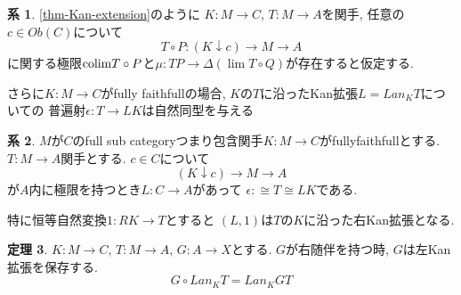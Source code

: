 \documentclass[dvipdfmx,a4paper,11pt]{report}
\newcommand{\colim}{{\rm colim}}
\theoremstyle{definition}
\newtheorem{thm}{定理}
\newtheorem{cor}[thm]{系}
\begin{document}
 \begin{tcolorbox}
 [colback = white, colframe = green!35!black, fonttitle = \bfseries,breakable = true]
\begin{cor}
\ref{thm-Kan-extension}のように
$K : M \to C$, $T : M \to A$を関手, 
任意の$c \in Ob(C)$について
$$
T \circ P : (K \downarrow c) \to M \to A
$$
に関する極限$\colim T\circ P$と$\mu:  TP \to \Delta (\lim T\circ Q)$が存在すると仮定する.

さらに$K : M \to C$がfully faithfullの場合, 
$K$の$T$に沿ったKan拡張$L = Lan_{K}T$についての
普遍射$\epsilon : T \to LK$は自然同型を与える
\end{cor}
\end{tcolorbox}

 \begin{tcolorbox}
 [colback = white, colframe = green!35!black, fonttitle = \bfseries,breakable = true]
\begin{cor}
$M$が$C$のfull sub categoryつまり包含関手$K : M \to C$がfullyfaithfullとする. 
$T : M \to A$関手とする. 
$c \in C$について
$$
( K \downarrow c) \to M \to A
$$
が$A$内に極限を持つとき$L : C \to A$があって
$\epsilon :  \cong T \cong LK$である.

特に恒等自然変換$1: RK \to T$とすると
$(L,1)$は$T$の$K$に沿った右Kan拡張となる. 
\end{cor}
\end{tcolorbox}

 \begin{tcolorbox}
 [colback = white, colframe = green!35!black, fonttitle = \bfseries,breakable = true]
\begin{thm}
$K : M \to C$, $T : M \to A$, $G :  A \to X$とする.
$G$が右随伴を持つ時, $G$は左Kan拡張を保存する. 
$$
G \circ Lan_{K} T = Lan_{K}GT
$$
\end{thm}
\end{tcolorbox}
\end{document}
